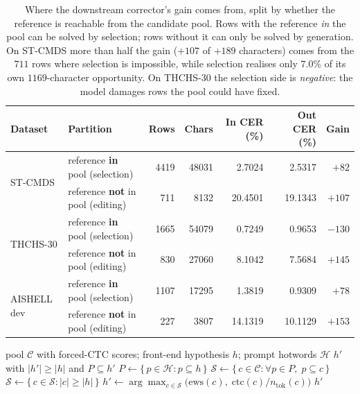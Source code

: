 \begin{table}[t]
\centering
\caption{Where the downstream corrector's gain comes from, split by whether the
reference is reachable from the candidate pool. Rows with the reference
\emph{in} the pool can be solved by selection; rows without it can only be solved
by generation. On ST-CMDS more than half the gain ($+107$ of $+189$ characters)
comes from the $711$ rows where selection is impossible, while selection realises
only $7.0\%$ of its own $1169$-character opportunity. On THCHS-30 the selection
side is \emph{negative}: the model damages rows the pool could have fixed.}
\label{tab:backend-gain}
\begin{tabular}{llrrrrr}
\toprule
Dataset & Partition & Rows & Chars & In CER (\%) & Out CER (\%) & Gain \\
\midrule
\multirow{2}{*}{ST-CMDS}
  & reference \textbf{in} pool (selection)     & 4419 & 48031 & 2.7024 & 2.5317 & $+82$ \\
  & reference \textbf{not} in pool (editing)   & 711  & 8132  & 20.4501 & 19.1343 & $+107$ \\
\midrule
\multirow{2}{*}{THCHS-30}
  & reference \textbf{in} pool (selection)     & 1665 & 54079 & 0.7249 & 0.9653 & $-130$ \\
  & reference \textbf{not} in pool (editing)   & 830  & 27060 & 8.1042 & 7.5684 & $+145$ \\
\midrule
\multirow{2}{*}{AISHELL dev}
  & reference \textbf{in} pool (selection)     & 1107 & 17295 & 1.3819 & 0.9309 & $+78$ \\
  & reference \textbf{not} in pool (editing)   & 227  & 3807  & 14.1319 & 10.1129 & $+153$ \\
\bottomrule
\end{tabular}
\end{table}

\begin{algorithm}[t]
\caption{Non-shortening, length-normalised pool rescoring}
\label{alg:rescoring}
\begin{algorithmic}[1]
\Require pool $\mathcal{C}$ with forced-CTC scores; front-end hypothesis $h$;
         prompt hotwords $\mathcal{H}$
\Ensure  $h'$ with $|h'| \ge |h|$ and $P \subseteq h'$
\State $P \leftarrow \{\, p \in \mathcal{H} : p \subseteq h \,\}$
\State $\mathcal{S} \leftarrow \{\, c \in \mathcal{C} : \forall p \in P,\; p \subseteq c \,\}$
\State $\mathcal{S} \leftarrow \{\, c \in \mathcal{S} : |c| \ge |h| \,\}$
\State $h' \leftarrow \arg\max_{c \in \mathcal{S}} \bigl( \mathrm{ews}(c),\; \mathrm{ctc}(c) / n_{\text{tok}}(c) \bigr)$
\State \Return $h'$ 
\end{algorithmic}
\end{algorithm}
